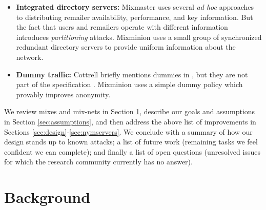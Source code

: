 \documentclass[11pt]{IEEEtran}
\begin{document}
\begin{itemize}
\item \textbf{Integrated directory servers:} Mixmaster uses several \emph{ad hoc}
approaches to distributing remailer availability, performance, and
key information. But the fact that users and remailers operate with
different information introduces \emph{partitioning} attacks. Mixminion
uses a small group of synchronized redundant directory servers
to provide uniform information about the network.

\item \textbf{Dummy traffic:} Cottrell briefly mentions dummies in
\cite{mixmaster-attacks}, but they are not part of the specification
\cite{mixmaster-spec}. Mixminion uses a simple dummy policy which provably
improves anonymity.

\end{itemize}


We review mixes and mix-nets in Section \ref{sec:background},
describe our goals and assumptions in Section \ref{sec:assumptions},
and then address the above list of improvements in Sections
\ref{sec:design}-\ref{sec:nymservers}. We conclude with a summary of how
our design stands up to known attacks; a list of future
work (remaining tasks we feel confident we can complete);
and finally a list of open questions (unresolved issues for which the
research community currently has no answer).




\section{Background}
\label{sec:background}
\end{document}
